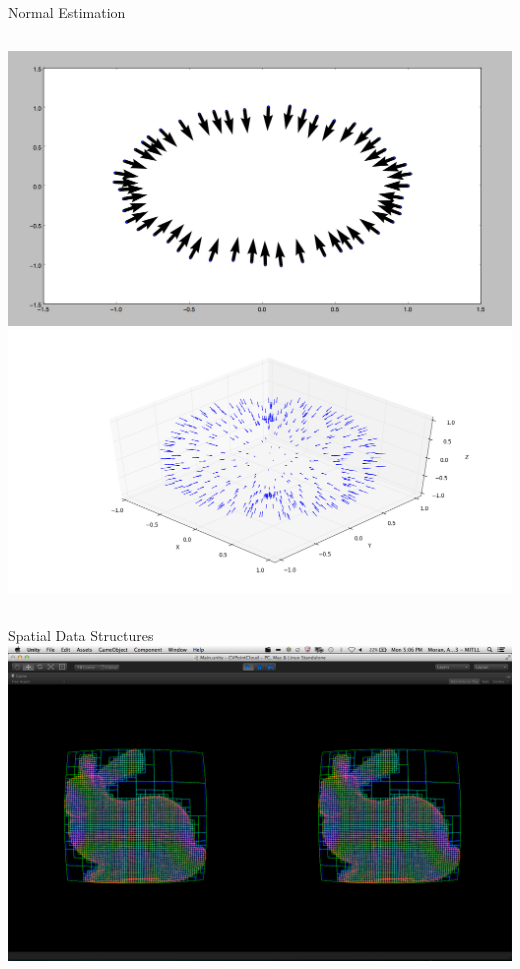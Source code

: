 \documentclass{beamer}
\begin{document}
\begin{frame}{Normal Estimation}
  \begin{columns}
  \includegraphics[width=\textwidth]{Images/normals.png}
    \includegraphics[width=\textwidth]{Images/3d_normals.png}
  \end{columns}
  
\end{frame}

\begin{frame}{Spatial Data Structures}
    \includegraphics[width=\textwidth]{Images/bunny_ortho_octree6.png}
\end{frame}
\end{document}
